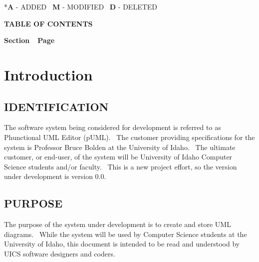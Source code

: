 \documentclass[twoside,letterpaper]{article}
\begin{document}
{\color{black}
\foreignlanguage{english}{*}\foreignlanguage{english}{\textbf{A}}\foreignlanguage{english}{
- ADDED
\ }\foreignlanguage{english}{\textbf{M}}\foreignlanguage{english}{ -
MODIFIED
\ }\foreignlanguage{english}{\textbf{D}}\foreignlanguage{english}{ -
DELETED}}


{\centering{}\bfseries\color{black}
TABLE OF CONTENTS
\par}


\bigskip

{\bfseries\color{black}
Section\ \ Page}

\setcounter{tocdepth}{9}
\renewcommand\contentsname{}
\tableofcontents

\bigskip








\clearpage\clearpage\setcounter{page}{1}\pagestyle{Convertii}
\section[Introduction]{\rmfamily\bfseries\color{black}
Introduction}

\subsection[IDENTIFICATION]{\rmfamily\bfseries\color{black}
IDENTIFICATION}
{\color{black}
The software system being considered for development is referred to as Phunctional UML Editor (pUML). \ The customer providing specifications
for the system is Professor Bruce Bolden at the University of Idaho. \ The ultimate
customer, or end-user, of the system will be University of Idaho Computer Science students and/or faculty. \ This is a new project effort, so the version under development is version 0.0.}

\subsection[PURPOSE]{\rmfamily\bfseries\color{black}
PURPOSE}
{\color{black}
The purpose of the system under development is to create and store UML diagrams.
\ While the system will be used by Computer Science students at the University of Idaho,
this document is intended to be read and understood by UICS software
designers and coders.}
\end{document}
